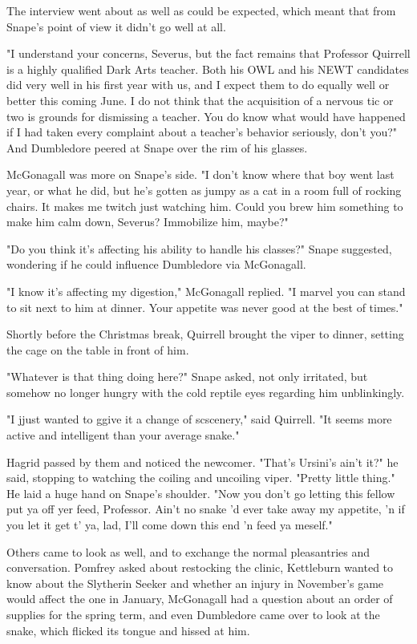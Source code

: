 The interview went about as well as could be expected, which meant that from Snape's point of view it didn't go well at all.

"I understand your concerns, Severus, but the fact remains that Professor Quirrell is a highly qualified Dark Arts teacher. Both his OWL and his NEWT candidates did very well in his first year with us, and I expect them to do equally well or better this coming June. I do not think that the acquisition of a nervous tic or two is grounds for dismissing a teacher. You do know what would have happened if I had taken every complaint about a teacher's behavior seriously, don't you?" And Dumbledore peered at Snape over the rim of his glasses.

McGonagall was more on Snape's side. "I don't know where that boy went last year, or what he did, but he's gotten as jumpy as a cat in a room full of rocking chairs. It makes me twitch just watching him. Could you brew him something to make him calm down, Severus? Immobilize him, maybe?"

"Do you think it's affecting his ability to handle his classes?" Snape suggested, wondering if he could influence Dumbledore via McGonagall.

"I know it's affecting my digestion," McGonagall replied. "I marvel you can stand to sit next to him at dinner. Your appetite was never good at the best of times."

Shortly before the Christmas break, Quirrell brought the viper to dinner, setting the cage on the table in front of him.

"Whatever is that thing doing here?" Snape asked, not only irritated, but somehow no longer hungry with the cold reptile eyes regarding him unblinkingly.

"I j{\el}just wanted to g{\el}give it a change of sc{\el}scenery," said Quirrell. "It seems more a{\el}ctive and in{\el}telligent than your average sn{\el}ake."

Hagrid passed by them and noticed the newcomer. "That's Ursini's ain't it?" he said, stopping to watching the coiling and uncoiling viper. "Pretty little thing." He laid a huge hand on Snape's shoulder. "Now you don't go letting this fellow put ya off yer feed, Professor. Ain't no snake 'd ever take away my appetite, 'n if you let it get t' ya, lad, I'll come down this end 'n feed ya meself."

Others came to look as well, and to exchange the normal pleasantries and conversation. Pomfrey asked about restocking the clinic, Kettleburn wanted to know about the Slytherin Seeker and whether an injury in November's game would affect the one in January, McGonagall had a question about an order of supplies for the spring term, and even Dumbledore came over to look at the snake, which flicked its tongue and hissed at him.

